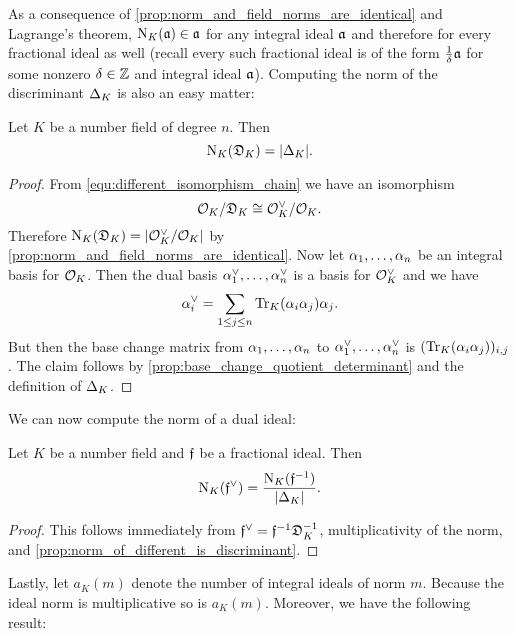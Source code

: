     As a consequence of \cref{prop:norm_and_field_norms_are_identical} and Lagrange's theorem, $\operatorname{\mathrm{N}}_{K}(\mathfrak{a}) \in \mathfrak{a}$ for any integral ideal $\mathfrak{a}$ and therefore for every fractional ideal as well (recall every such fractional ideal is of the form $\frac{1}{\delta}\mathfrak{a}$ for some nonzero $\delta \in \mathbb{Z}$ and integral ideal $\mathfrak{a}$). Computing the norm of the discriminant $\Delta_{K}$ is also an easy matter:

    \begin{proposition}\label{prop:norm_of_different_is_discriminant}
      Let $K$ be a number field of degree $n$. Then
      \[
        \operatorname{\mathrm{N}}_{K}(\mathfrak{D}_{K}) = |\Delta_{K}|.
      \]
    \end{proposition}
    \begin{proof}
      From \cref{equ:different_isomorphism_chain} we have an isomorphism
      \[
        \mathcal{O}_{K}/\mathfrak{D}_{K} \cong \mathcal{O}_{K}^{\vee}/\mathcal{O}_{K}.
      \]
      Therefore $\operatorname{\mathrm{N}}_{K}(\mathfrak{D}_{K}) = |\mathcal{O}_{K}^{\vee}/\mathcal{O}_{K}|$ by \cref{prop:norm_and_field_norms_are_identical}. Now let $\alpha_{1},\ldots,\alpha_{n}$ be an integral basis for $\mathcal{O}_{K}$. Then the dual basis $\alpha_{1}^{\vee},\ldots,\alpha_{n}^{\vee}$ is a basis for $\mathcal{O}_{K}^{\vee}$ and we have
      \[
        \alpha_{i}^{\vee} = \sum_{1 \le j \le n}\operatorname{\mathrm{Tr}}_{K}(\alpha_{i}\alpha_{j})\alpha_{j}.
      \]
      But then the base change matrix from $\alpha_{1},\ldots,\alpha_{n}$ to $\alpha_{1}^{\vee},\ldots,\alpha_{n}^{\vee}$ is $(\operatorname{\mathrm{Tr}}_{K}(\alpha_{i}\alpha_{j}))_{i,j}$. The claim follows by \cref{prop:base_change_quotient_determinant} and the definition of $\Delta_{K}$.
    \end{proof}

    We can now compute the norm of a dual ideal:

    \begin{corollary}\label{cor:norm_of_different}
      Let $K$ be a number field and $\mathfrak{f}$ be a fractional ideal. Then
      \[
        \operatorname{\mathrm{N}}_{K}(\mathfrak{f}^{\vee}) = \frac{\operatorname{\mathrm{N}}_{K}(\mathfrak{f}^{-1})}{|\Delta_{K}|}.
      \]
    \end{corollary}
    \begin{proof}
      This follows immediately from $\mathfrak{f}^{\vee} = \mathfrak{f}^{-1}\mathfrak{D}_{K}^{-1}$, multiplicativity of the norm, and \cref{prop:norm_of_different_is_discriminant}.
    \end{proof}

    Lastly, let $a_{K}(m)$ denote the number of integral ideals of norm $m$. Because the ideal norm is multiplicative so is $a_{K}(m)$. Moreover, we have the following result:

